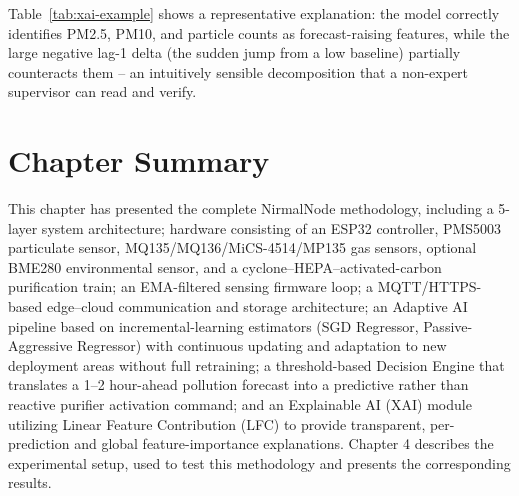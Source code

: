 \noindent Table~\ref{tab:xai-example} shows a representative explanation: the model correctly identifies PM2.5, PM10, and particle counts as forecast-raising features, while the large negative lag-1 delta (the sudden jump from a low baseline) partially counteracts them -- an intuitively sensible decomposition that a non-expert supervisor can read and verify.

\FloatBarrier

\section{Chapter Summary}
\label{sec:meth-summary}

This chapter has presented the complete NirmalNode methodology, including a 5-layer system architecture; hardware consisting of an ESP32 controller, PMS5003 particulate sensor, MQ135/MQ136/MiCS-4514/MP135 gas sensors, optional BME280 environmental sensor, and a cyclone--HEPA--activated-carbon purification train; an EMA-filtered sensing firmware loop; a MQTT/HTTPS-based edge--cloud communication and storage architecture; an Adaptive AI pipeline based on incremental-learning estimators (SGD Regressor, Passive-Aggressive Regressor) with continuous updating and adaptation to new deployment areas without full retraining; a threshold-based Decision Engine that translates a 1--2 hour-ahead pollution forecast into a predictive rather than reactive purifier activation command; and an Explainable AI (XAI) module utilizing Linear Feature Contribution (LFC) to provide transparent, per-prediction and global feature-importance explanations. Chapter 4 describes the experimental setup, used to test this methodology and presents the corresponding results.
